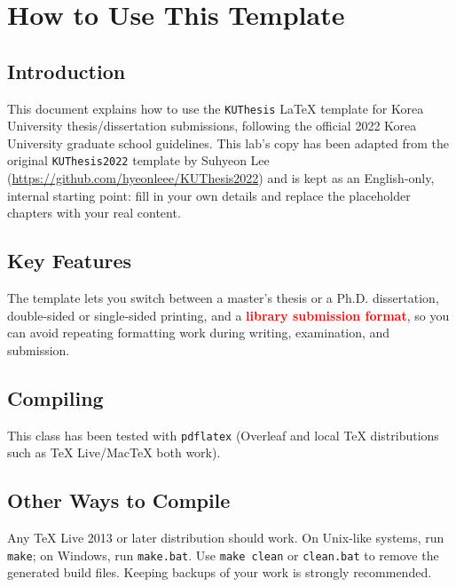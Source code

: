 \chapter{How to Use This Template}


\section{Introduction}
This document explains how to use the \texttt{KUThesis} \LaTeX{} template for Korea University thesis/dissertation submissions, following the official 2022 Korea University graduate school guidelines. This lab's copy has been adapted from the original \texttt{KUThesis2022} template by Suhyeon Lee (\url{https://github.com/hyeonleee/KUThesis2022}) and is kept as an English-only, internal starting point: fill in your own details and replace the placeholder chapters with your real content.

\section{Key Features}
The template lets you switch between a master's thesis or a Ph.D. dissertation, double-sided or single-sided printing, and a \textbf{\textcolor{red}{library submission format}}, so you can avoid repeating formatting work during writing, examination, and submission.

\section{Compiling}
This class has been tested with \texttt{pdflatex} (Overleaf and local TeX distributions such as TeX Live/MacTeX both work).

\section{Other Ways to Compile}
Any TeX Live 2013 or later distribution should work. On Unix-like systems, run \texttt{make}; on Windows, run \texttt{make.bat}. Use \texttt{make clean} or \texttt{clean.bat} to remove the generated build files. Keeping backups of your work is strongly recommended.


